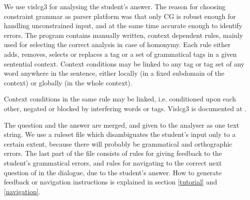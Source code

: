 \documentclass[11pt]{article}
\begin{document}
%
%
%

We use vislcg3 for analysing the student's answer. The reason for choosing constraint grammar as parser platform was that only CG is robust enough for handling unconstrained input, and at the same time accurate enough to identify errors. The program  contains manually written, context dependent rules, mainly used for selecting the correct analysis in case of homonymy. Each rule either adds, removes, selects or replaces a tag or a set of grammatical tags in a given sentential context. Context conditions may be linked to any tag or tag set of any word anywhere in the sentence, either locally (in a fixed subdomain of the context) or globally (in the whole context). 

Context conditions in the same rule may be linked, i.e. conditioned upon each other, negated or blocked by interfering words or tags. Vislcg3 is documented at \cite{Visl:08}.

The question and the answer are merged, and given to the analyser as one text string. We use a ruleset file which disambiguates the student's input only to a certain extent, because there will probably be grammatical and orthographic errors. The last part of the file consists of rules for giving feedback to the student's grammatical errors, and rules for navigating to the correct next question of in the dialogue, due to the student's answer. How to generate feedback or navigation instructions is explained in section \ref{tutorial} and \ref{navigation}.
\end{document}
